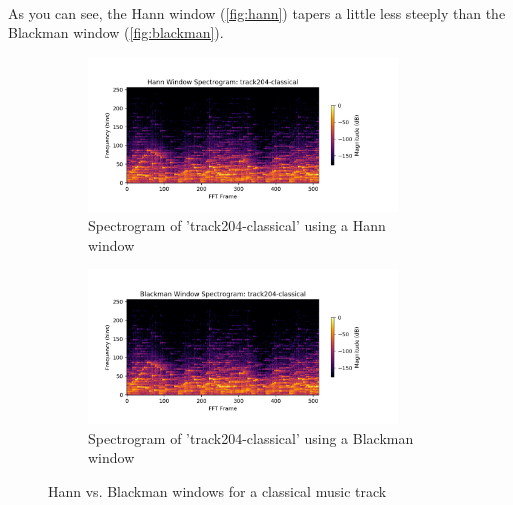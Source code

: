 \documentclass[11pt,a4paper]{article}
\begin{document}
\paragraph*{} As you can see, the Hann window (\ref{fig:hann}) tapers a little less steeply than the Blackman window (\ref{fig:blackman}).
\clearpage

\begin{figure}[tb]
	\centering
	\begin{subfigure}[t]{\hsize}
		\centering
		\includegraphics[width=0.9\textwidth]{powerHann_track204-classical}
		\caption{Spectrogram of 'track204-classical' using a Hann window}
		\label{fig:hann_classical}
	\end{subfigure}
	\begin{subfigure}[t]{\hsize}
		\centering
		\includegraphics[width=0.9\textwidth]{powerBlack_track204-classical}
		\caption{Spectrogram of 'track204-classical' using a Blackman window}
		\label{fig:black_classical}
	\end{subfigure}
	\caption{Hann vs. Blackman windows for a classical music track}
	\label{fig:windows_classical}
\end{figure}
\clearpage
\end{document}
